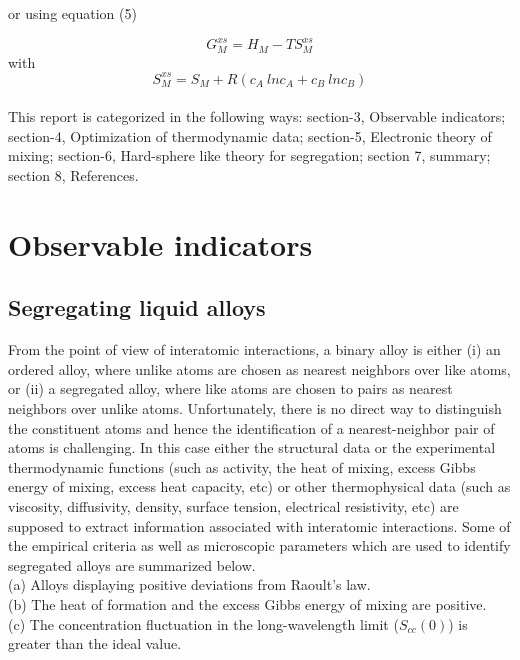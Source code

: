\documentclass[12pt]{article}
\newcommand*{\1}{\hspace{1pt}}
\begin{document}
    or using equation (5)

        \begin{equation}
            G ^ {xs} _M = H _M - T S ^{xs} _M
        \end{equation}
    with
        \begin{equation}
            S ^{xs} _M = S _M + R (c _A \ ln c_A + c _B \ ln c _B)
        \end{equation}\\

    This report is categorized in the following ways:  section-3, Observable indicators; section-4, 
    Optimization of thermodynamic data; section-5, Electronic theory of mixing; section-6, Hard-sphere 
    like theory for segregation; section 7, summary; section 8, References.\\


    \section{ Observable indicators}


    \subsection{ Segregating liquid alloys}

        From the point of view of interatomic interactions, a binary alloy is either (i) an ordered
    alloy, where unlike atoms are chosen as nearest neighbors over like atoms, or (ii) a
    segregated alloy, where like atoms are chosen to pairs as nearest neighbors over unlike
    atoms. Unfortunately, there is no direct way to distinguish the constituent atoms and
    hence the identification of a nearest-neighbor pair of atoms is challenging. In this case
    either the structural data or the experimental thermodynamic functions (such as activity, the heat of
    mixing, excess Gibbs energy of mixing, excess heat capacity, etc) or other thermophysical
    data (such as viscosity, diffusivity, density, surface tension, electrical resistivity, etc) are
    supposed to extract information associated with interatomic interactions. Some of the
    empirical criteria as well as microscopic parameters which are used to identify segregated
    alloys are summarized below.\\
    (a) Alloys displaying positive deviations from Raoult’s law.\\
    (b) The heat of formation and the excess Gibbs energy of mixing are positive.\\
    (c) The concentration fluctuation in the long-wavelength limit ($ S _{cc}(0) $) is greater than
        the ideal value.
\end{document}
